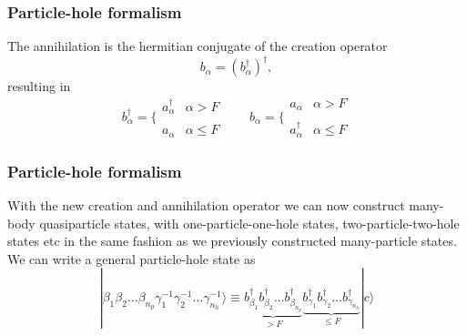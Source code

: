\documentclass[compress]{beamer}
\newcommand*{\ket}[1]{|#1\rangle}
\begin{document}
\frame
{
  \frametitle{Particle-hole formalism}
\begin{small}
{\scriptsize
The annihilation is the hermitian conjugate of the creation operator
\[
	b_\alpha = (b_\alpha^\dagger)^\dagger,
\]
resulting in
\begin{equation}
	b_\alpha^\dagger = \Bigg\{ \begin{array}{ll}
		a_\alpha^\dagger & \alpha > F \\
		\\
		a_\alpha & \alpha \leq F
	\end{array} \qquad 
	b_\alpha = \Bigg\{ \begin{array}{ll}
		a_\alpha & \alpha > F \\
		\\
		 a_\alpha^\dagger & \alpha \leq F
	\end{array} \label{eq:2-54}
\end{equation}
}
\end{small}
}


\frame
{
  \frametitle{Particle-hole formalism}
\begin{small}
{\scriptsize
With the new creation and annihilation operator  we can now construct 
many-body quasiparticle states, with one-particle-one-hole states, two-particle-two-hole
states etc in the same fashion as we previously constructed many-particle states. 
We can write a general particle-hole state as
\begin{equation}
	\ket{\beta_1\beta_2\dots \beta_{n_p} \gamma_1^{-1} \gamma_2^{-1} \dots \gamma_{n_h}^{-1}} \equiv
		\underbrace{b_{\beta_1}^\dagger b_{\beta_2}^\dagger \dots b_{\beta_{n_p}}^\dagger}_{>F}
		\underbrace{b_{\gamma_1}^\dagger b_{\gamma_2}^\dagger \dots b_{\gamma_{n_h}}^\dagger}_{\leq F} \ket{c}
		\label{eq:2-56}
\end{equation}
}
\end{small}
}
\end{document}
